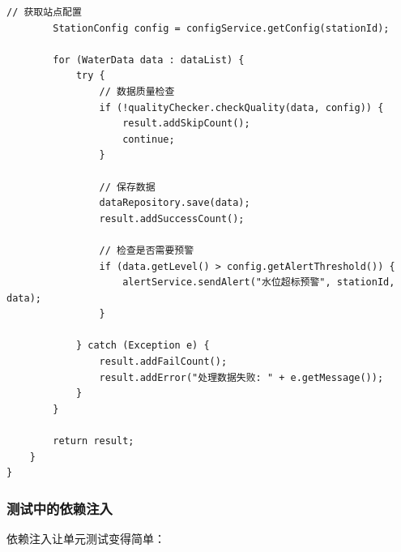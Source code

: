 \begin{lstlisting}[style=java]
        // 获取站点配置
        StationConfig config = configService.getConfig(stationId);
        
        for (WaterData data : dataList) {
            try {
                // 数据质量检查
                if (!qualityChecker.checkQuality(data, config)) {
                    result.addSkipCount();
                    continue;
                }
                
                // 保存数据
                dataRepository.save(data);
                result.addSuccessCount();
                
                // 检查是否需要预警
                if (data.getLevel() > config.getAlertThreshold()) {
                    alertService.sendAlert("水位超标预警", stationId, data);
                }
                
            } catch (Exception e) {
                result.addFailCount();
                result.addError("处理数据失败: " + e.getMessage());
            }
        }
        
        return result;
    }
}
\end{lstlisting}

\hypertarget{ux6d4bux8bd5ux4e2dux7684ux4f9dux8d56ux6ce8ux5165}{%
\subsubsection{测试中的依赖注入}\label{ux6d4bux8bd5ux4e2dux7684ux4f9dux8d56ux6ce8ux5165}}

依赖注入让单元测试变得简单：

